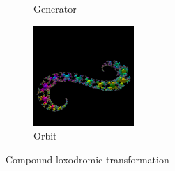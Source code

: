 \begin{figure}[h!tbp]
\begin{minipage}{0.49\hsize}
\begin{subfigure}{0.24\textwidth}
\begin{center}
    \caption{Generator}
    \label{fig:compLoxoGen}
   \end{center}
  \end{subfigure}
 \hspace*{\fill}
 \begin{subfigure}{0.24\textwidth}
  \begin{center}
   \includegraphics[width=1.5in, height=1.5in, keepaspectratio]{../img/klein/3diis/compLoxoOrb.pdf}
   \caption{Orbit}
   \label{fig:compLoxoOrb}
  \end{center}
 \end{subfigure}
  \hspace*{\fill}
  \caption{Compound loxodromic transformation}
  \label{fig:compLoxo}
 \end{minipage}
\end{figure}


